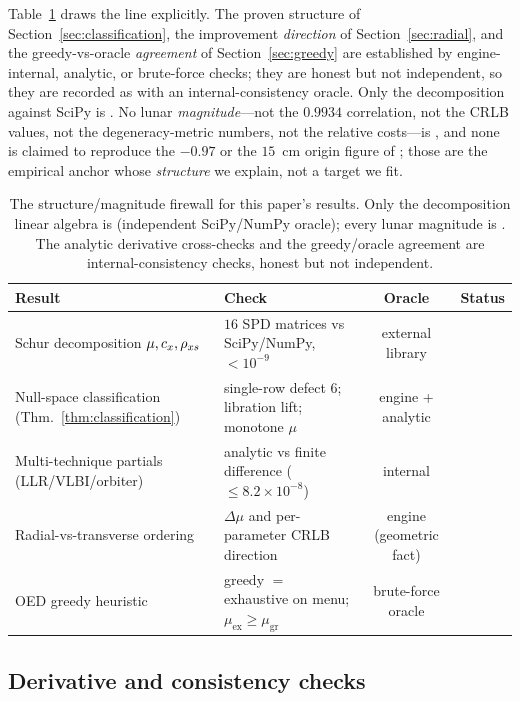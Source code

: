 Table~\ref{tab:honesty} draws the line explicitly. The proven structure of
Section~\ref{sec:classification}, the improvement \emph{direction} of
Section~\ref{sec:radial}, and the greedy-vs-oracle \emph{agreement} of
Section~\ref{sec:greedy} are established by engine-internal, analytic, or
brute-force checks; they are honest but not independent, so they are recorded as
\Modelled{} with an internal-consistency oracle. Only the decomposition against
SciPy is \Validated{}. No lunar \emph{magnitude}---not the $0.9934$ correlation,
not the CRLB values, not the degeneracy-metric numbers, not the relative
costs---is \Validated{}, and none is claimed to reproduce the $-0.97$ or the
$15$~cm origin figure of \citet{sosnica2025ilrf}; those are the empirical anchor
whose \emph{structure} we explain, not a target we fit.

\begin{table}[t]
\centering
\caption{The structure/magnitude firewall for this paper's results. Only the
decomposition linear algebra is \Validated{} (independent SciPy/NumPy oracle);
every lunar magnitude is \Modelled{}. The analytic derivative cross-checks and the
greedy/oracle agreement are internal-consistency checks, honest but not
independent.}
\label{tab:honesty}
\small
\begin{tabular}{@{}p{5.4cm}p{4.0cm}cc@{}}
\toprule
\textbf{Result} & \textbf{Check} & \textbf{Oracle} & \textbf{Status} \\
\midrule
Schur decomposition $\mu,c_x,\rho_{x s}$ &
$16$ SPD matrices vs SciPy/NumPy, $<\!10^{-9}$ &
external library & \Validated{} \\[3pt]
Null-space classification (Thm.~\ref{thm:classification}) &
single-row defect $6$; libration lift; monotone $\mu$ &
engine + analytic & \Modelled{} \\[3pt]
Multi-technique partials (LLR/VLBI/orbiter) &
analytic vs finite difference ($\le\!8.2\times10^{-8}$) &
internal & \Modelled{} \\[3pt]
Radial-vs-transverse ordering &
$\Delta\mu$ and per-parameter CRLB direction &
engine (geometric fact) & \Modelled{} \\[3pt]
OED greedy heuristic &
greedy $=$ exhaustive on menu; $\mu_{\text{ex}}\ge\mu_{\text{gr}}$ &
brute-force oracle & \Modelled{} \\
\bottomrule
\end{tabular}
\end{table}

\subsection{Derivative and consistency checks}
\label{sec:derivchecks}

